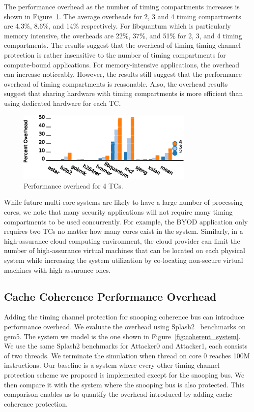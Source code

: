 The performance overhead as the number of timing compartments increases is 
shown in Figure~\ref{fig:scalability}. The average overheads %
for 2, 3 and 4 timing compartments are 4.3\%, 8.6\%, and 14\% 
respectively. For libquantum which is particularly memory intensive, the 
overheads are 22\%, 37\%, and 51\% for 2, 3, and 4 timing compartments. The 
results suggest that the overhead of timing timing channel protection is rather 
insensitive to the number of timing compartments for compute-bound 
applications. For memory-intensive applications, the overhead can increase 
noticeably. However, the results still suggest that the performance overhead
of timing compartments is reasonable. Also, the overhead results suggest
that sharing hardware with timing compartments is more efficient than
using dedicated hardware for each TC.

\begin{figure}
    \begin{center}
        \includegraphics[width=3.4in]{figs/scalability.eps}
        \caption{Performance overhead for 4 TCs.}
        \label{fig:scalability}
    \end{center}
\end{figure}

While future multi-core systems are likely to have a large number of processing 
cores, we note that many security applications will not require many timing 
compartments to be used concurrently. For example, the BYOD application only 
requires two TCs no matter how many cores exist in the system. Similarly, in a 
high-assurance cloud computing environment, the cloud provider can limit the
number of high-assurance virtual machines that can be located on each physical
system while increasing the system utilization by co-locating non-secure
virtual machines with high-assurance ones.

\subsection{Cache Coherence Performance Overhead}

Adding the timing channel protection for snooping coherence bus can introduce 
performance overhead. We evaluate the overhead using Splash2~\cite{splash2} benchmarks on 
gem5. The system we model is the one shown in Figure~\ref{fig:coherent_system}.
We use the same Splash2 benchmarks for Attacker0 and Attacker1, each consists 
of two threads. We terminate the simulation
when thread on core 0 reaches 100M instructions.  Our baseline is a system 
where every other timing channel protection scheme we proposed is implemented 
except for the snooping bus.
We then compare it with the system where the snooping bus is also protected. 
This comparison enables us to quantify the overhead introduced by adding 
cache coherence protection. 

